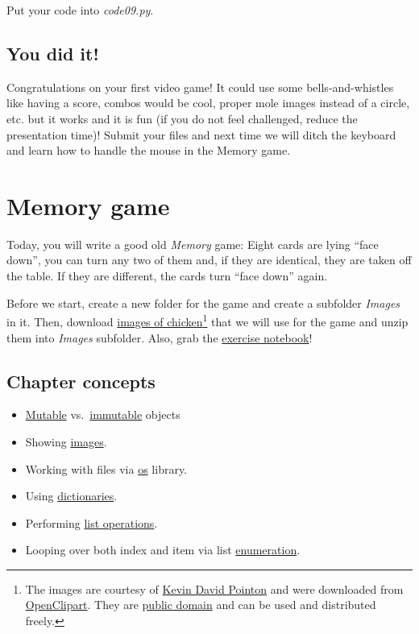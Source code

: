 \documentclass[
]{book}
\providecommand{\tightlist}{%
  \setlength{\itemsep}{0pt}\setlength{\parskip}{0pt}}
\begin{document}
Put your code into \emph{code09.py}.

\hypertarget{you-did-it}{%
\section{You did it!}\label{you-did-it}}

Congratulations on your first video game! It could use some bells-and-whistles like having a score, combos would be cool, proper mole images instead of a circle, etc. but it works and it is fun (if you do not feel challenged, reduce the presentation time)! Submit your files and next time we will ditch the keyboard and learn how to handle the mouse in the Memory game.

\hypertarget{memory-game}{%
\chapter{Memory game}\label{memory-game}}

Today, you will write a good old \emph{Memory} game: Eight cards are lying ``face down'', you can turn any two of them and, if they are identical, they are taken off the table. If they are different, the cards turn ``face down'' again.

Before we start, create a new folder for the game and create a subfolder \emph{Images} in it. Then, download \href{material/chicken.zip}{images of chicken}\footnote{The images are courtesy of \href{https://openclipart.org/artist/Firkin}{Kevin David Pointon} and were downloaded
  from \href{https://openclipart.org/}{OpenClipart}. They are \href{https://creativecommons.org/publicdomain/zero/1.0/}{public domain} and can be used and distributed freely.} that we will use for the game and unzip them into \emph{Images} subfolder. Also, grab the \href{notebooks/Memory\%20game.ipynb}{exercise notebook}!

\hypertarget{chapter-concepts-5}{%
\section{Chapter concepts}\label{chapter-concepts-5}}

\begin{itemize}
\tightlist
\item
  \protect\hyperlink{mutable-objects}{Mutable} vs.~\protect\hyperlink{variables-as-boxes-immutable-objects}{immutable} objects
\item
  Showing \protect\hyperlink{imagestim}{images}.
\item
  Working with files via \protect\hyperlink{os-library}{os} library.
\item
  Using \protect\hyperlink{dictionaries}{dictionaries}.
\item
  Performing \protect\hyperlink{list-operations}{list operations}.
\item
  Looping over both index and item via list \protect\hyperlink{enumerate}{enumeration}.
\end{itemize}
\end{document}
